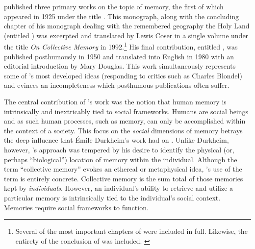 \halbwachs published three primary works on the topic of
memory, the first of which appeared in 1925 under the title
.\autocite{halbwachs1925} This
monograph, along with the concluding chapter of his monograph dealing
with the remembered geography the Holy Land (entitled
) was excerpted and translated by
Lewis Coser in a single volume under the title \emph{On Collective
Memory} in 1992.\footnote{Several of the most important chapters of
 were included in full. Likewise, the
entirety of the conclusion of  was
included. \autocites{halbwachs1992}{halbwachs1941}} His final contribution,
entitled , was published posthumously
in 1950 and translated into English in 1980 with an editorial
introduction by Mary Douglas.\autocite{halbwachs1980} This work
simultaneously represents some of \halbwachs's most
developed ideas (responding to critics such as Charles Blondel) and
evinces an incompleteness which posthumous publications often
suffer.\autocites{halbwachs1980}[As Coser observes, ``One may doubt that
the author himself would have been willing to publish it in what seems
to be an unfinished state. The book nevertheless contains many further
developments of \halbwachs's thought in regard to such
matters as the relation of space and time to collective memory as well
as fruitful definitions and applications of the differences between
individual, collective, and historical
memory.''][2]{coser_halbwachs1992}

The central contribution of \halbwachs's work was the
notion that human memory is intrinsically and inextricably tied to
social frameworks. Humans are social beings and as such human processes,
such as memory, can only be accomplished within the context of a
society. This focus on the \emph{social} dimensions of memory betrays
the deep influence that Émile Durkheim's work had on
\halbwachs. Unlike Durkheim, however,
\halbwachs's approach was tempered by his desire to
identify the physical (or, perhaps ``biological'') location of memory
within the individual. Although the term ``collective memory'' evokes an
ethereal or metaphysical idea, \halbwachs's use of the
term is entirely concrete. Collective memory is the sum total of those
memories kept by \emph{individuals}. However, an individual's ability to
retrieve and utilize a particular memory is intrinsically tied to the
individual's social context. Memories require social frameworks to
function.\autocite[38]{halbwachs1992}

